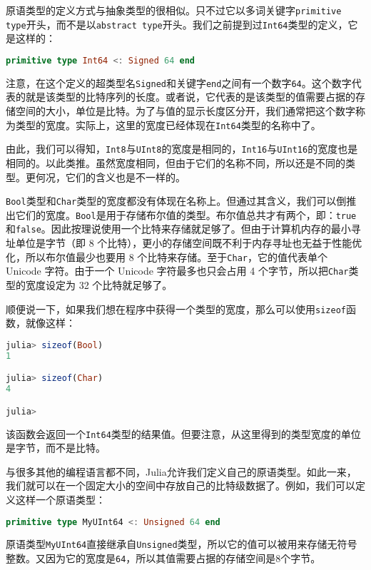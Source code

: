原语类型的定义方式与抽象类型的很相似。只不过它以多词关键字\verb`primitive type`开头，而不是以\verb`abstract type`开头。我们之前提到过\verb`Int64`类型的定义，它是这样的：

\begin{lstlisting}[language=julia]
primitive type Int64 <: Signed 64 end
\end{lstlisting}

注意，在这个定义的超类型名\verb`Signed`和关键字\verb`end`之间有一个数字\verb`64`。这个数字代表的就是该类型的比特序列的长度。或者说，它代表的是该类型的值需要占据的存储空间的大小，单位是比特。为了与值的显示长度区分开，我们通常把这个数字称为类型的宽度。实际上，这里的宽度已经体现在\verb`Int64`类型的名称中了。

由此，我们可以得知，\verb`Int8`与\verb`UInt8`的宽度是相同的，\verb`Int16`与\verb`UInt16`的宽度也是相同的。以此类推。虽然宽度相同，但由于它们的名称不同，所以还是不同的类型。更何况，它们的含义也是不一样的。

\verb`Bool`类型和\verb`Char`类型的宽度都没有体现在名称上。但通过其含义，我们可以倒推出它们的宽度。\verb`Bool`是用于存储布尔值的类型。布尔值总共才有两个，即：\verb`true`和\verb`false`。因此按理说使用一个比特来存储就足够了。但由于计算机内存的最小寻址单位是字节（即 8 个比特），更小的存储空间既不利于内存寻址也无益于性能优化，所以布尔值最少也要用 8 个比特来存储。至于\verb`Char`，它的值代表单个 Unicode 字符。由于一个 Unicode 字符最多也只会占用 4 个字节，所以把\verb`Char`类型的宽度设定为 32 个比特就足够了。

顺便说一下，如果我们想在程序中获得一个类型的宽度，那么可以使用\verb`sizeof`函数，就像这样：

\begin{lstlisting}[language=julia]
julia> sizeof(Bool)
1

julia> sizeof(Char)
4

julia> 
\end{lstlisting}

该函数会返回一个\verb`Int64`类型的结果值。但要注意，从这里得到的类型宽度的单位是字节，而不是比特。

与很多其他的编程语言都不同，Julia允许我们定义自己的原语类型。如此一来，我们就可以在一个固定大小的空间中存放自己的比特级数据了。例如，我们可以定义这样一个原语类型：

\begin{lstlisting}[language=julia]
primitive type MyUInt64 <: Unsigned 64 end
\end{lstlisting}

原语类型\verb`MyUInt64`直接继承自\verb`Unsigned`类型，所以它的值可以被用来存储无符号整数。又因为它的宽度是\verb`64`，所以其值需要占据的存储空间是8个字节。

